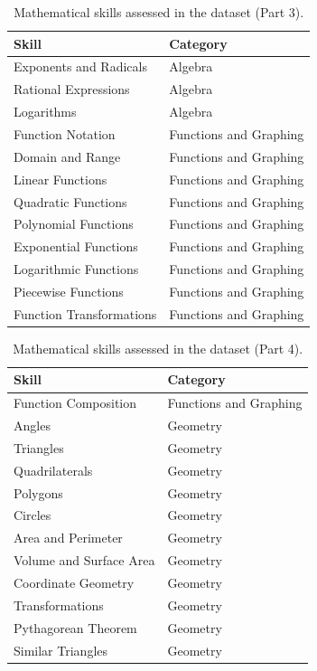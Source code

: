 \documentclass[11pt]{article}
\begin{document}
\begin{table}
\centering
\caption{Mathematical skills assessed in the dataset (Part 3).}
\begin{tabular}{p{}p{}}
\toprule
\textbf{Skill} & \textbf{Category} \\
\midrule
Exponents and Radicals & Algebra \\
Rational Expressions & Algebra \\
Logarithms & Algebra \\
Function Notation & Functions and Graphing \\
Domain and Range & Functions and Graphing \\
Linear Functions & Functions and Graphing \\
Quadratic Functions & Functions and Graphing \\
Polynomial Functions & Functions and Graphing \\
Exponential Functions & Functions and Graphing \\
Logarithmic Functions & Functions and Graphing \\
Piecewise Functions & Functions and Graphing \\
Function Transformations & Functions and Graphing \\
\bottomrule
\end{tabular}
\end{table}

\begin{table}
\centering
\caption{Mathematical skills assessed in the dataset (Part 4).}
\begin{tabular}{p{}p{}}
\toprule
\textbf{Skill} & \textbf{Category} \\
\midrule
Function Composition & Functions and Graphing \\
Angles & Geometry \\
Triangles & Geometry \\
Quadrilaterals & Geometry \\
Polygons & Geometry \\
Circles & Geometry \\
Area and Perimeter & Geometry \\
Volume and Surface Area & Geometry \\
Coordinate Geometry & Geometry \\
Transformations & Geometry \\
Pythagorean Theorem & Geometry \\
Similar Triangles & Geometry \\
\bottomrule
\end{tabular}
\end{table}
\end{document}
